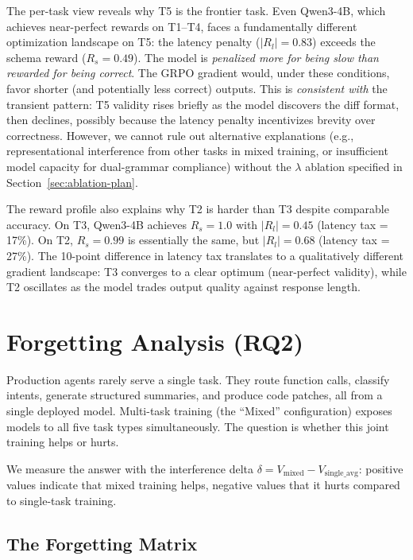 \documentclass[11pt]{article}
\begin{document}
The per-task view reveals why T5 is the frontier task.  Even Qwen3-4B, which achieves near-perfect rewards on T1--T4, faces a fundamentally different optimization landscape on T5: the latency penalty ($|R_l| = 0.83$) exceeds the schema reward ($R_s = 0.49$).  The model is \emph{penalized more for being slow than rewarded for being correct}.  The GRPO gradient would, under these conditions, favor shorter (and potentially less correct) outputs.  This is \emph{consistent with} the transient pattern: T5 validity rises briefly as the model discovers the diff format, then declines, possibly because the latency penalty incentivizes brevity over correctness.  However, we cannot rule out alternative explanations (e.g., representational interference from other tasks in mixed training, or insufficient model capacity for dual-grammar compliance) without the $\lambda$ ablation specified in Section~\ref{sec:ablation-plan}.

The reward profile also explains why T2 is harder than T3 despite comparable accuracy.  On T3, Qwen3-4B achieves $R_s = 1.0$ with $|R_l| = 0.45$ (latency tax = 17\%).  On T2, $R_s = 0.99$ is essentially the same, but $|R_l| = 0.68$ (latency tax = 27\%).  The 10-point difference in latency tax translates to a qualitatively different gradient landscape: T3 converges to a clear optimum (near-perfect validity), while T2 oscillates as the model trades output quality against response length.

\section{Forgetting Analysis (RQ2)}
\label{sec:forgetting}

Production agents rarely serve a single task.  They route function calls, classify intents, generate structured summaries, and produce code patches, all from a single deployed model.  Multi-task training (the ``Mixed'' configuration) exposes models to all five task types simultaneously.  The question is whether this joint training helps or hurts.

We measure the answer with the interference delta $\delta = V_{\text{mixed}} - V_{\text{single\_avg}}$: positive values indicate that mixed training helps, negative values that it hurts compared to single-task training.

\subsection{The Forgetting Matrix}
\end{document}
